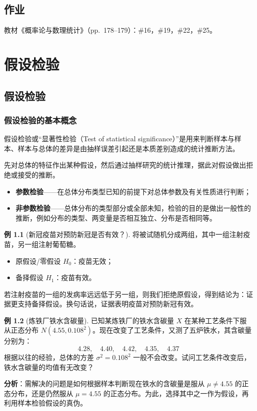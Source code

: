 \documentclass[11pt,a4paper]{report}
\theoremstyle{definition}
\newtheorem{example}{例}[chapter]
\begin{document}
\section*{作业}

教材《概率论与数理统计》（pp.~178--179）：\#16，\#19，\#22，\#25。

\newpage
\chapter{假设检验}

\section{假设检验}

\subsection{假设检验的基本概念}

假设检验或“显著性检验（Test of statistical significance）”是用来判断样本与样本、样本与总体的差异是由抽样误差引起还是本质差别造成的统计推断方法。

先对总体的特征作出某种假设，然后通过抽样研究的统计推理，据此对假设做出拒绝或接受的推断。

\begin{itemize}[leftmargin=2em]
    \item \textbf{参数检验}——在总体分布类型已知的前提下对总体参数及有关性质进行判断；
    \item \textbf{非参数检验}——总体分布的类型部分或全部未知，检验的目的是做出一般性的推断，例如分布的类型、两变量是否相互独立、分布是否相同等。
\end{itemize}

\begin{example}[新冠疫苗对预防新冠是否有效？]
将被试随机分成两组，其中一组注射疫苗，另一组注射葡萄糖。
\begin{itemize}[leftmargin=2em]
    \item 原假设/零假设 $H_{0}$：疫苗无效；
    \item 备择假设 $H_{1}$：疫苗有效。
\end{itemize}
若注射疫苗的一组的发病率远远低于另一组，则我们拒绝原假设，得到结论为：证据更支持备择假设。换句话说，证据表明疫苗对预防新冠有效。
\end{example}

\begin{example}[炼铁厂铁水含碳量]
已知某炼铁厂的铁水含碳量 $X$ 在某种工艺条件下服从正态分布 $N(4.55,0.108^{2})$。现在改变了工艺条件，又测了五炉铁水，其含碳量分别为：
\[
4.28,\quad 4.40,\quad 4.42,\quad 4.35,\quad 4.37
\]
根据以往的经验，总体的方差 $\sigma^{2}=0.108^{2}$ 一般不会改变。试问工艺条件改变后，铁水含碳量的均值有无改变？

\textbf{分析}：需解决的问题是如何根据样本判断现在铁水的含碳量是服从 $\mu\neq 4.55$ 的正态分布，还是仍然服从 $\mu=4.55$ 的正态分布。为此，选择其中之一作为假设，再利用样本检验假设的真伪。
\end{example}
\end{document}
